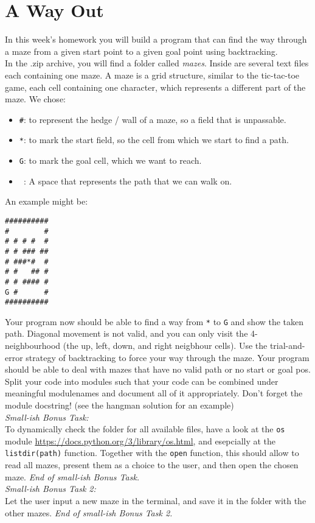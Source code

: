 \section{A Way Out}
In this week's homework you will build a program that can find the way through a maze
from a given start point to a given goal point using backtracking.\\
In the .zip archive, you will find a folder called \textit{mazes}. Inside are several
text files each containing one maze. A maze is a grid structure, similar to the
tic-tac-toe game, each cell containing one character, which represents a different
part of the maze. We chose:
\begin{itemize}
    \item \texttt{\#}: to represent the hedge / wall of a maze, so a field that is unpassable.
    \item \texttt{*}: to mark the start field, so the cell from which we start to find a path.
    \item \texttt{G}: to mark the goal cell, which we want to reach.
    \item \texttt{ }: A space that represents the path that we can walk on.
\end{itemize}
An example might be:
\begin{spacing}{0}\begin{verbatim}
##########
#        #
# # # #  #
# # ### ##
# ###*#  #
# #   ## #
# # #### #
G #      #
##########
\end{verbatim}\end{spacing}\vspace{6pt}\noindent
Your program now should be able to find a way from \texttt{*} to \texttt{G} and show
the taken path. Diagonal movement is not valid, and you can only visit the 4-neighbourhood
(the up, left, down, and right neigbhour cells).
Use the trial-and-error strategy of backtracking to force your way 
through the maze. Your program should be able to deal with mazes that have no valid
path or no start or goal pos. Split your code into modules such that your code can 
be combined under meaningful modulenames and document all of it appropriately.
Don't forget the module docstring! (see the hangman solution for an example)\\
\emph{Small-ish Bonus Task:}\\
To dynamically check the folder for all available files, have a look at the 
\texttt{os} module \url{https://docs.python.org/3/library/os.html}, and esepcially
at the \texttt{listdir(path)} function. Together with the \texttt{open} function,
this should allow to read all mazes, present them as a choice to the user, and 
then open the chosen maze. \emph{End of small-ish Bonus Task.}\\
\emph{Small-ish Bonus Task 2:}\\
Let the user input a new maze in the terminal, and save it in the folder with
the other mazes. \emph{End of small-ish Bonus Task 2.}

